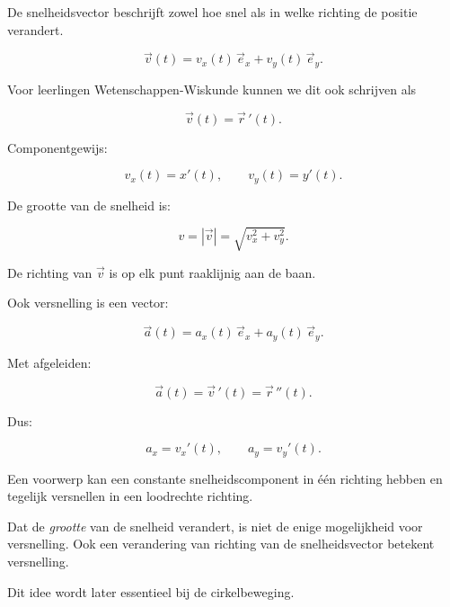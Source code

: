 \documentclass{ximera}
\begin{document}


De snelheidsvector beschrijft zowel hoe snel als in welke richting de
positie verandert.

\[
\boxed{
\vec v(t)=v_x(t)\,\vec e_x+v_y(t)\,\vec e_y.
}
\]

Voor leerlingen Wetenschappen-Wiskunde kunnen we dit ook schrijven als

\[
\boxed{
\vec v(t)=\vec r\,'(t).
}
\]

Componentgewijs:

\[
v_x(t)=x'(t),
\qquad
v_y(t)=y'(t).
\]

De grootte van de snelheid is:

\[
\boxed{
v=|\vec v|
=
\sqrt{v_x^2+v_y^2}.
}
\]

De richting van $\vec v$ is op elk punt raaklijnig aan de baan.



Ook versnelling is een vector:

\[
\boxed{
\vec a(t)=a_x(t)\,\vec e_x+a_y(t)\,\vec e_y.
}
\]

Met afgeleiden:

\[
\boxed{
\vec a(t)=\vec v\,'(t)=\vec r\,''(t).
}
\]

Dus:

\[
a_x=v_x'(t),
\qquad
a_y=v_y'(t).
\]

Een voorwerp kan een constante snelheidscomponent in één richting
hebben en tegelijk versnellen in een loodrechte richting.


\begin{opmerking}

Dat de \emph{grootte} van de snelheid verandert, is niet de enige
mogelijkheid voor versnelling. Ook een verandering van richting van
de snelheidsvector betekent versnelling.

Dit idee wordt later essentieel bij de cirkelbeweging.

\end{opmerking}
\end{document}
